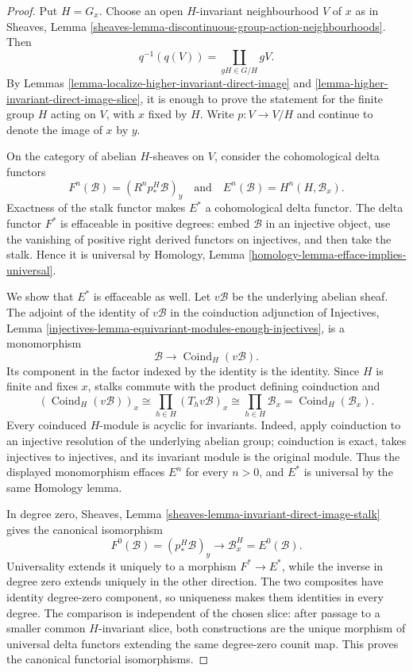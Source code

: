 \begin{proof}
Put $H=G_x$. Choose an open $H$-invariant neighbourhood $V$ of $x$ as in
Sheaves, Lemma
\ref{sheaves-lemma-discontinuous-group-action-neighbourhoods}. Then
$$
q^{-1}(q(V)) = \coprod_{gH \in G/H}gV.
$$
By Lemmas \ref{lemma-localize-higher-invariant-direct-image} and
\ref{lemma-higher-invariant-direct-image-slice}, it is enough to prove the
statement for the finite group $H$ acting on $V$, with $x$ fixed by $H$.
Write $p : V \to V/H$ and continue to denote the image of $x$ by $y$.

On the category of abelian $H$-sheaves on $V$, consider the cohomological
delta functors
$$
F^n(\mathcal{B}) = (R^np_*^H\mathcal{B})_y
\quad\text{and}\quad
E^n(\mathcal{B}) = H^n(H, \mathcal{B}_x).
$$
Exactness of the stalk functor makes $E^*$ a cohomological delta functor.
The delta functor $F^*$ is effaceable in positive degrees: embed
$\mathcal{B}$ in an injective object, use the vanishing of positive right
derived functors on injectives, and then take the stalk. Hence it is
universal by Homology, Lemma
\ref{homology-lemma-efface-implies-universal}.

We show that $E^*$ is effaceable as well. Let $v\mathcal{B}$ be the
underlying abelian sheaf. The adjoint of the identity of $v\mathcal{B}$ in
the coinduction adjunction of Injectives, Lemma
\ref{injectives-lemma-equivariant-modules-enough-injectives}, is a
monomorphism
$$
\mathcal{B}
\longrightarrow
\operatorname{Coind}_H(v\mathcal{B}).
$$
Its component in the factor indexed by the identity is the identity. Since
$H$ is finite and fixes $x$, stalks commute with the product defining
coinduction and
$$
(\operatorname{Coind}_H(v\mathcal{B}))_x
\cong \prod_{h \in H}(T_hv\mathcal{B})_x
\cong \prod_{h \in H}\mathcal{B}_x
=
\operatorname{Coind}_H(\mathcal{B}_x).
$$
Every coinduced $H$-module is acyclic for invariants. Indeed, apply
coinduction to an injective resolution of the underlying abelian group;
coinduction is exact, takes injectives to injectives, and its invariant
module is the original module. Thus the displayed monomorphism effaces
$E^n$ for every $n>0$, and $E^*$ is universal by the same Homology lemma.

In degree zero, Sheaves, Lemma
\ref{sheaves-lemma-invariant-direct-image-stalk} gives the canonical
isomorphism
$$
F^0(\mathcal{B})=(p_*^H\mathcal{B})_y
\longrightarrow
\mathcal{B}_x^H=E^0(\mathcal{B}).
$$
Universality extends it uniquely to a morphism $F^*\to E^*$, while the
inverse in degree zero extends uniquely in the other direction. The two
composites have identity degree-zero component, so uniqueness makes them
identities in every degree. The comparison is independent of the chosen
slice: after passage to a smaller common $H$-invariant slice, both
constructions are the unique morphism of universal delta functors extending
the same degree-zero counit map. This proves the canonical functorial
isomorphisms.
\end{proof}


